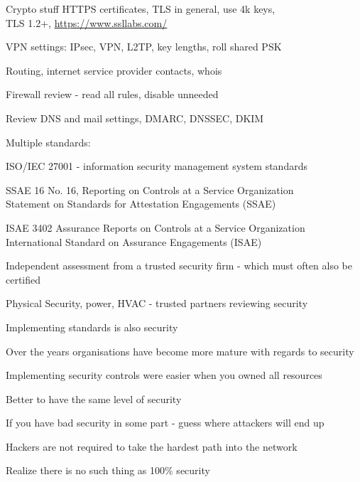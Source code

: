 \documentclass[20pt,landscape,a4paper,footrule]{foils}
\begin{document}

\begin{list1}
\item Crypto stuff
HTTPS certificates, TLS in general, use 4k keys, \\
TLS 1.2+, \url{https://www.ssllabs.com/}
\item VPN settings: IPsec, VPN, L2TP, key lengths, roll shared PSK
\item Routing, internet service provider contacts, whois
\item Firewall review - read all rules, disable unneeded
\item Review DNS and mail settings, DMARC, DNSSEC, DKIM
\end{list1}



Multiple standards:
\begin{list2}
\item ISO/IEC 27001 - information security management system standards\\
\item SSAE 16 No. 16, Reporting on Controls at a Service Organization\\
Statement on Standards for Attestation Engagements (SSAE) 
\item ISAE 3402 Assurance Reports on Controls at a Service Organization\\
International Standard on Assurance Engagements (ISAE)
\item Independent assessment from a trusted security firm - which must often also be certified
\item Physical Security, power, HVAC - trusted partners reviewing security
\item Implementing standards is also security
\end{list2}

Over the years organisations have become more mature with regards to security

Implementing security controls were easier when you owned all resources



\begin{list1}
\item Better to have the same level of security
\item If you have bad security in some part - guess where attackers will end up
\item Hackers are not required to take the hardest path into the network
\item Realize there is no such thing as 100\% security
\end{list1}
\end{document}
